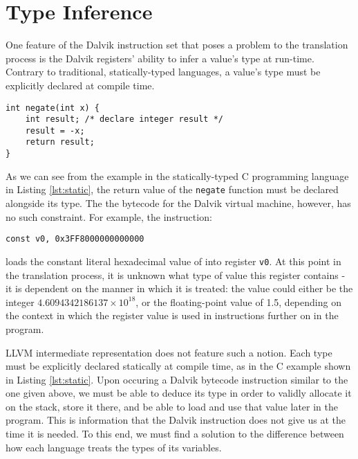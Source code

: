 \section{Type Inference}
\label{sec:typeinf}

One feature of the Dalvik instruction set that poses a problem to the translation process is the Dalvik registers' ability to infer a value's type at run-time. Contrary to traditional, statically-typed languages, a value's type must be explicitly declared at compile time.

\lstset{
	language=C,
	basicstyle=\small,
	stringstyle=\ttfamily
}

\begin{lstlisting}[frame=single, caption={C static typing example}, label=lst:static]
int negate(int x) {
    int result; /* declare integer result */
    result = -x;
    return result;
}
\end{lstlisting}

As we can see from the example in the statically-typed C programming language in Listing \ref{lst:static}, the return value of the \verb|negate| function must be declared alongside its type. The the bytecode for the Dalvik virtual machine, however, has no such constraint. For example, the instruction:

\lstset{
	language=Assembly,
	basicstyle=\small,
	stringstyle=\ttfamily
}

\begin{lstlisting}[]
const v0, 0x3FF8000000000000
\end{lstlisting}

loads the constant literal hexadecimal value of  into register \verb|v0|. At this point in the translation process, it is unknown what type of value this register contains - it is dependent on the manner in which it is treated: the value could either be the integer $4.6094342186137 \times 10^{18}$, or the floating-point value of 1.5, depending on the context in which the register value is used in instructions further on in the program.

LLVM intermediate representation does not feature such a notion. Each type must be explicitly declared statically at compile time, as in the C example shown in Listing \ref{lst:static}. Upon occuring a Dalvik bytecode instruction similar to the one given above, we must be able to deduce its type in order to validly allocate it on the stack, store it there, and be able to load and use that value later in the program. This is information that the Dalvik instruction does not give us at the time it is needed. To this end, we must find a solution to the difference between how each language treats the types of its variables.

